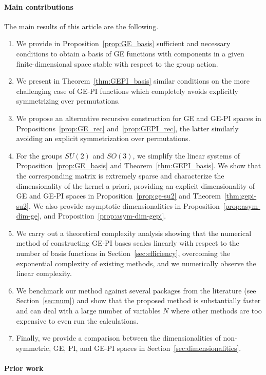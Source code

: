 \documentclass{article}
\numberwithin{equation}{section}
\begin{document}
\paragraph{Main contributions} The main results of this article are the following.
\begin{enumerate}
    \item We provide in Proposition~\ref{prop:GE_basis} sufficient and necessary conditions to obtain a basis of GE functions with components in a given finite-dimensional space stable with respect to the group action.
    \item We present in Theorem~\ref{thm:GEPI_basis} similar conditions on the more challenging case of GE-PI functions which completely avoids explicitly symmetrizing over permutations.
    \item We propose an alternative recursive construction for GE and GE-PI spaces in Propositions~\ref{prop:GE_rec} and~\ref{prop:GEPI_rec}, the latter 
    similarly
    avoiding an explicit symmetrization over permutations.
    \item For the groups $SU(2)$ and $SO(3)$, we simplify the linear systems of  Proposition~\ref{prop:GE_basis} and Theorem~\ref{thm:GEPI_basis}. We show that the corresponding matrix is extremely sparse and characterize the dimensionality of the kernel a priori, providing an explicit dimensionality of GE and GE-PI spaces in Proposition~\ref{prop:ge-su2} and Theorem~\ref{thm:gepi-su2}.
    We also provide asymptotic dimensionalities in Proposition~\ref{prop:asym-dim-ge}, and Proposition~\ref{prop:asym-dim-gepi}.
    \item We carry out a theoretical complexity analysis showing that the numerical method of constructing GE-PI bases scales linearly with respect to the number of basis functions in Section~\ref{sec:efficiency}, overcoming the exponential complexity of existing methods, and we numerically observe  the linear complexity.
    \item We benchmark our method against several packages from the literature (see Section~\ref{sec:num}) and show that the proposed method is substantially faster and can deal with a large number of variables $N$ where other methods are too expensive to even run the calculations.
    \item Finally, we provide a comparison between the dimensionalities of non-symmetric, GE, PI, and GE-PI spaces in Section~\ref{sec:dimensionalities}.
\end{enumerate}


\paragraph{Prior work}
\end{document}
